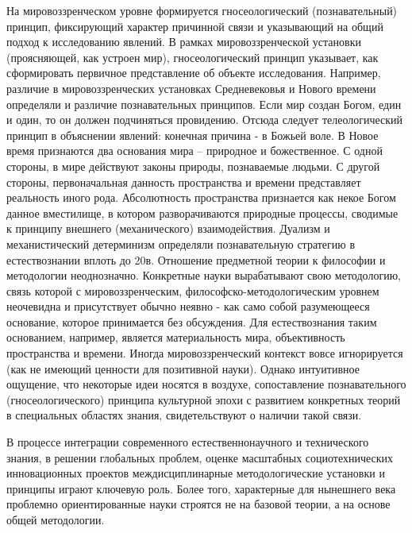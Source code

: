 \documentclass[exam_answers.tex]{subfiles}
\begin{document}
На мировоззренческом уровне формируется гносеологический
(познавательный) принцип, фиксирующий характер причинной связи и
указывающий на общий подход к исследованию явлений. В рамках
мировоззренческой установки (проясняющей, как устроен мир),
гносеологический принцип указывает, как сформировать первичное
представление об объекте исследования. Например, различие в
мировоззренческих установках Средневековья и Нового времени определяли и
различие познавательных принципов. Если мир создан Богом, един и один, то
он должен подчиняться провидению. Отсюда следует телеологический принцип
в объяснении явлений: конечная причина - в Божьей воле. В Новое время
признаются два основания мира – природное и божественное. С одной стороны,
в мире действуют законы природы, познаваемые людьми. С другой стороны,
первоначальная данность пространства и времени представляет реальность
иного рода. Абсолютность пространства признается как некое Богом данное
вместилище, в котором разворачиваются природные процессы, сводимые к
принципу внешнего (механического) взаимодействия. Дуализм и
механистический детерминизм определяли познавательную стратегию в
естествознании вплоть до 20в.
Отношение предметной теории к философии и методологии неоднозначно.
Конкретные науки вырабатывают свою методологию, связь которой с
мировоззренческим, философско-методологическим уровнем неочевидна и
присутствует обычно неявно - как само собой разумеющееся основание,
которое принимается без обсуждения. Для естествознания таким основанием,
например, является материальность мира, объективность пространства и
времени. Иногда мировоззренческий контекст вовсе игнорируется (как не
имеющий ценности для позитивной науки). Однако интуитивное ощущение,
что некоторые идеи носятся в воздухе, сопоставление познавательного
(гносеологического) принципа культурной эпохи с развитием конкретных
теорий в специальных областях знания, свидетельствуют о наличии такой
связи.

В процессе интеграции современного естественнонаучного и технического
знания, в решении глобальных проблем, оценке масштабных социотехнических
инновационных проектов междисциплинарные методологические установки и
принципы играют ключевую роль. Более того, характерные для нынешнего
века проблемно ориентированные науки строятся не на базовой теории, а на
основе общей методологии.
\end{document}
